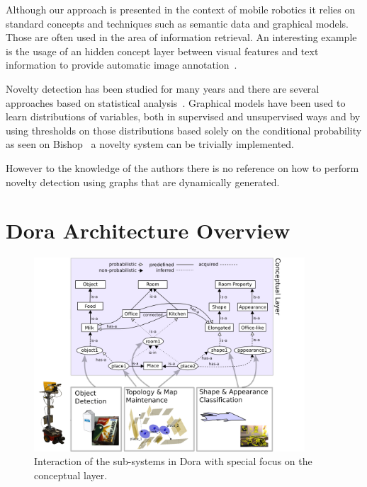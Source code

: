 \documentclass[runningheads,a4paper]{llncs}
\begin{document}
Although our approach is presented in the context of mobile robotics it relies on
standard concepts and techniques such as semantic data and graphical models.
Those are often used in the area of information retrieval.
An interesting example is the usage of an hidden concept layer between visual features
and text information to provide automatic image annotation~\cite{zhang2006probabilistic}.

Novelty detection has been studied for many years and there are several approaches
based on statistical analysis~\cite{markou2003novelty}.
Graphical models have been used to learn distributions of variables, both in
supervised and unsupervised ways and by using thresholds on those distributions
based solely on the conditional probability as seen on Bishop~\cite{bishop1994novelty}
a novelty system can be trivially implemented.

However to the knowledge of the authors there is no reference on how to perform
novelty detection using graphs that are dynamically generated.

\section{Dora Architecture Overview}
\label{sec:overview}

\begin{figure}[h]
\centering
\includegraphics[width=0.9\textwidth]{figures/processes.pdf}
\caption{\label{fig:conceptual-layer}Interaction of the sub-systems
         in Dora with special focus on the conceptual layer.}
\end{figure}
\end{document}
